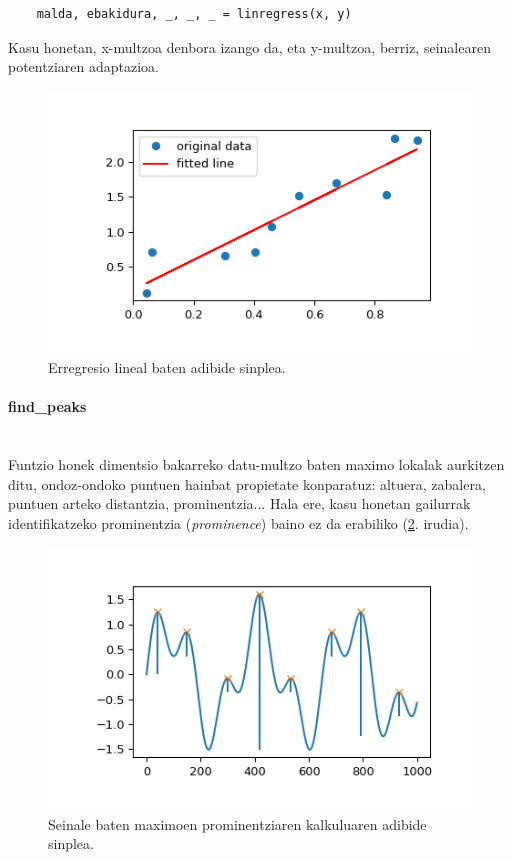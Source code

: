 \documentclass[12pt]{article}
\numberwithin{figure}{section}
\numberwithin{equation}{section}
\begin{document}
\begin{verbatim}
    malda, ebakidura, _, _, _ = linregress(x, y)
\end{verbatim}

Kasu honetan, x-multzoa denbora izango da, eta y-multzoa, berriz, seinalearen potentziaren adaptazioa.

\begin{figure}[h]
    \centering
    \includegraphics[width=0.55\linewidth]{4 - Detekzio teknikak/linear_regression.png}
    \caption{Erregresio lineal baten adibide sinplea.}
    \label{fig:linear_regression}
\end{figure}

\paragraph{find\_peaks} \leavevmode\\

Funtzio honek dimentsio bakarreko datu-multzo baten maximo lokalak aurkitzen ditu, ondoz-ondoko puntuen hainbat propietate konparatuz: altuera, zabalera, puntuen arteko distantzia, prominentzia... Hala ere, kasu honetan gailurrak identifikatzeko prominentzia (\textit{prominence}) baino ez da erabiliko (\ref{fig:prominence}. irudia).

\begin{figure}[h]
    \centering
    \includegraphics[width=0.55\linewidth]{4 - Detekzio teknikak/prominences.png}
    \caption{Seinale baten maximoen prominentziaren kalkuluaren adibide sinplea.}
    \label{fig:prominence}
\end{figure}
\end{document}
